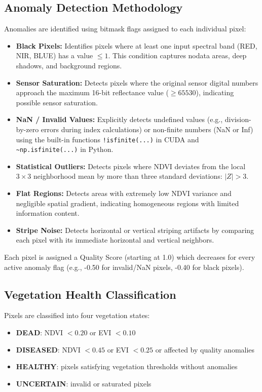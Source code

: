 \documentclass[10pt,conference,compsoc]{IEEEtran}
\begin{document}
\subsection{Anomaly Detection Methodology}
Anomalies are identified using bitmask flags assigned to each individual pixel:
\begin{itemize}
    \item \textbf{Black Pixels:} Identifies pixels where at least one input spectral band (RED, NIR, BLUE) has a value $\leq 1$. This condition captures nodata areas, deep shadows, and background regions.
    \item \textbf{Sensor Saturation:} Detects pixels where the original sensor digital numbers approach the maximum 16-bit reflectance value ($\geq 65530$), indicating possible sensor saturation.
    \item \textbf{NaN / Invalid Values:} Explicitly detects undefined values (e.g., division-by-zero errors during index calculations) or non-finite numbers (NaN or Inf) using the built-in functions \texttt{!isfinite(...)} in CUDA and \texttt{\textasciitilde np.isfinite(...)} in Python.
    \item \textbf{Statistical Outliers:} Detects pixels where NDVI deviates from the local $3\times3$ neighborhood mean by more than three standard deviations: $|Z|>3$.
    \item \textbf{Flat Regions:} Detects areas with extremely low NDVI variance and negligible spatial gradient, indicating homogeneous regions with limited information content.
    \item \textbf{Stripe Noise:} Detects horizontal or vertical striping artifacts by comparing each pixel with its immediate horizontal and vertical neighbors.
\end{itemize}

Each pixel is assigned a Quality Score (starting at 1.0) which decreases for every active anomaly flag (e.g., -0.50 for invalid/NaN pixels, -0.40 for black pixels).

\subsection{Vegetation Health Classification}

Pixels are classified into four vegetation states:
\begin{itemize}
    \item \textbf{DEAD}: NDVI $< 0.20$ or EVI $< 0.10$
    \item \textbf{DISEASED}: NDVI $< 0.45$ or EVI $< 0.25$ or affected by quality anomalies
    \item \textbf{HEALTHY}: pixels satisfying vegetation thresholds without anomalies
    \item \textbf{UNCERTAIN}: invalid or saturated pixels
\end{itemize}
\end{document}
